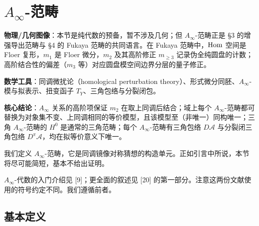 
\section{\texorpdfstring{$A_\infty$-范畴}{A∞-范畴}}\label{sec:ainf}

\begin{keytakeaways}
  \item \textbf{物理/几何图像}：本节是纯代数的预备，暂不涉及几何；但 $A_\infty$-范畴正是 §3 的增强导出范畴与 §4 的 Fukaya 范畴的共同语言。在 Fukaya 范畴中，$\operatorname{Hom}$ 空间是 Floer 复形，$m_1$ 是 Floer 微分，$m_2$ 及其高阶修正 $m_{\ge 3}$ 记录伪全纯圆盘的计数；高阶结合性的偏差（$m_3$ 等）对应圆盘模空间边界分层的量子修正。
  \item \textbf{数学工具}：同调微扰论（homological perturbation theory）、形式微分同胚、$A_\infty$-模与拟表示、扭变函子 $T_Y$、三角包络与分裂闭包。
  \item \textbf{核心结论}：$A_\infty$ 关系的高阶项保证 $m_2$ 在取上同调后结合；域上每个 $A_\infty$-范畴都可替换为对象集不变、上同调相同的等价模型，且该模型至（非唯一）同构唯一；三角 $A_\infty$-范畴的 $H^0$ 是通常的三角范畴；每个 $A_\infty$-范畴有三角包络 $D\mathcal{A}$ 与分裂闭三角包络 $D^\pi\mathcal{A}$，均在拟等价意义下唯一。
\end{keytakeaways}

我们定义 $A_\infty$-范畴，它是同调镜像对称猜想的构造单元。正如引言中所说，本节将尽可能简短，基本不给出证明。

$A_\infty$-代数的入门介绍见 [9]；更全面的叙述见 [20] 的第一部分。注意这两份文献使用的符号约定不同。我们遵循前者。


\subsection{基本定义}\label{subsec:ainf-basic}

